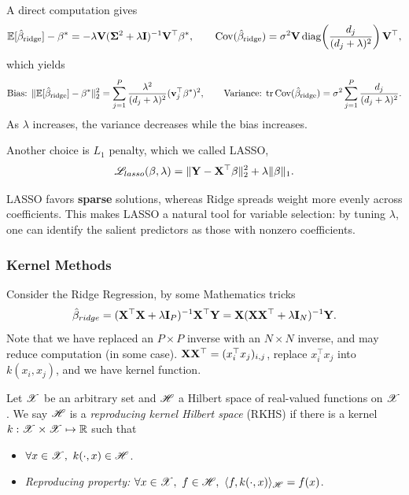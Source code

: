 A direct computation gives
\[
\mathbb{E}[\hat{\mathbf{\beta}}_{\text{ridge}}] - \mathbf{\beta}^* = -\lambda \mathbf{V} (\mathbf{\Sigma}^2 + \lambda \mathbf{I})^{-1} \mathbf{V}^\top \mathbf{\beta}^*, \qquad \mathrm{Cov}(\hat{\mathbf{\beta}}_{\text{ridge}}) = \sigma^2 \mathbf{V} \, \mathrm{diag}\!\left(\frac{d_j}{(d_j+\lambda)^2}\right) \mathbf{V}^\top,
\]
which yields
\[
\text{Bias: }\| \mathbb{E}[\hat{\mathbf{\beta}}_{\text{ridge}}] - \mathbf{\beta}^* \|_2^2 = \sum_{j=1}^{P} \frac{\lambda^2}{(d_j + \lambda)^2} (\mathbf{v}_j^\top \mathbf{\beta}^*)^2, \qquad \text{Variance: }\mathrm{tr}\,\mathrm{Cov}(\hat{\mathbf{\beta}}_{\text{ridge}}) = \sigma^2 \sum_{j=1}^{P} \frac{d_j}{(d_j + \lambda)^2}.
\]
As $\lambda$ increases, the variance decreases while the bias increases.

Another choice is $L_1$ penalty, which we called LASSO,
\[
\mathcal{L}_{lasso}(\mathbf{\beta}, \lambda) = \|\mathbf{Y}-\mathbf{X}^\top\mathbf{\beta}\|_2^2 + \lambda \|\mathbf{\beta}\|_1.
\]
\begin{rem}
    LASSO favors \textbf{sparse} solutions, whereas Ridge spreads weight more evenly across coefficients. This makes LASSO a natural tool for variable selection: by tuning $\lambda$, one can identify the salient predictors as those with nonzero coefficients.
\end{rem}

\subsubsection{Kernel Methods}
Consider the Ridge Regression, by some Mathematics tricks
\[
\hat{\mathbf{\beta}}_{ridge} = (\mathbf{X}^\top \mathbf{X} + \lambda \mathbf{I}_P)^{-1} \mathbf{X}^\top \mathbf{Y} = \mathbf{X}(\mathbf{X} \mathbf{X}^\top + \lambda \mathbf{I}_N)^{-1}  \mathbf{Y}.
\]
Note that we have replaced an $P\times P$ inverse with an $N\times N$ inverse, and may reduce computation (in some case). $\mathbf{X} \mathbf{X}^\top = (x_i^\top x_j)_{i,j}$, replace $x_i^\top x_j$ into $k(x_i,x_j)$, and we have kernel function.

\begin{defn}
Let $\mathcal{X}$ be an arbitrary set and $\mathcal{H}$ a Hilbert space of real-valued functions on $\mathcal{X}$. We say $\mathcal{H}$ is a \emph{reproducing kernel Hilbert space} (RKHS) if there is a kernel $k : \mathcal{X} \times \mathcal{X} \mapsto \mathbb{R}$ such that
\begin{itemize}
    \item $\forall x \in \mathcal{X},\ k(\cdot, x) \in \mathcal{H}$.
    \item \emph{Reproducing property:} $\forall x \in \mathcal{X},\ f \in \mathcal{H},\ \langle f, k(\cdot, x) \rangle_{\mathcal{H}} = f(x)$.
\end{itemize}
\end{defn}


